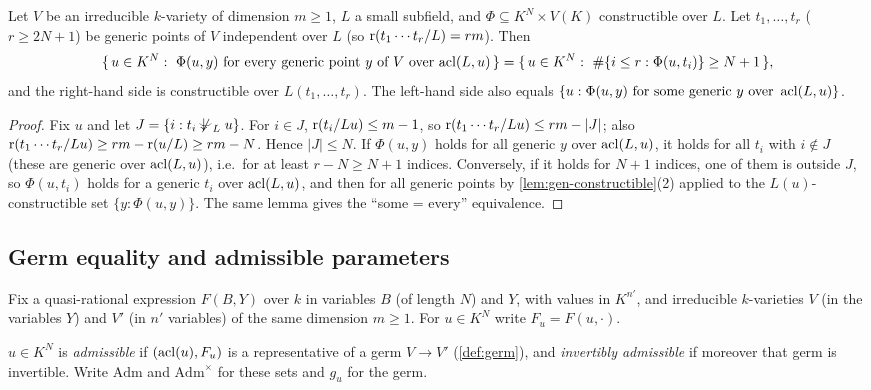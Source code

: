 \begin{lemma}\label{lem:genquant}
Let $V$ be an irreducible $k$-variety of dimension $m\ge1$, $L$ a small subfield, and
$\Phi\subseteq K^N\times V(K)$ constructible over $L$.  Let $t_1,\dots,t_r$ ($r\ge2N+1$) be
generic points of $V$ independent over $L$ (so $\operatorname{r}(t_1\cdots t_r/L)=rm$).  Then
\[
  \{\,u\in K^N:\ \Phi(u,y)\text{ for every generic point $y$ of $V$ over $\operatorname{acl}(L,u)$}\,\}
  =\{\,u\in K^N:\ \#\{i\le r:\Phi(u,t_i)\}\ge N+1\,\},
\]
and the right-hand side is constructible over $L(t_1,\dots,t_r)$.  The left-hand side
also equals $\{u:\Phi(u,y)\text{ for some generic $y$ over }\operatorname{acl}(L,u)\}$.
\end{lemma}
\begin{proof}
Fix $u$ and let $J=\{i: t_i\not\ind{L}u\}$.  For $i\in J$, $\operatorname{r}(t_i/Lu)\le m-1$, so
$\operatorname{r}(t_1\cdots t_r/Lu)\le rm-|J|$; also $\operatorname{r}(t_1\cdots t_r/Lu)\ge rm-\operatorname{r}(u/L)\ge rm-N$.
Hence $|J|\le N$.  If $\Phi(u,y)$ holds for all generic $y$ over $\operatorname{acl}(L,u)$, it holds
for all $t_i$ with $i\notin J$ (these are generic over $\operatorname{acl}(L,u)$), i.e.\ for at least
$r-N\ge N+1$ indices.  Conversely, if it holds for $N+1$ indices, one of them is outside
$J$, so $\Phi(u,t_i)$ holds for a generic $t_i$ over $\operatorname{acl}(L,u)$, and then for all
generic points by \cref{lem:gen-constructible}(2) applied to the $L(u)$-constructible set
$\{y:\Phi(u,y)\}$.  The same lemma gives the ``some = every'' equivalence.
\end{proof}

\subsection{Germ equality and admissible parameters}

Fix a quasi-rational expression $F(B,Y)$ over $k$ in variables $B$ (of length $N$) and
$Y$, with values in $K^{n'}$, and irreducible $k$-varieties $V$ (in the variables $Y$) and
$V'$ (in $n'$ variables) of the same dimension $m\ge1$.  For $u\in K^N$ write
$F_u=F(u,\cdot)$.

\begin{definition}\label{def:admissible}
$u\in K^N$ is \emph{admissible} if $(\operatorname{acl}(u),F_u)$ is a representative of a germ $V\to V'$
(\cref{def:germ}), and \emph{invertibly admissible} if moreover that germ is invertible.
Write $\mathrm{Adm}$ and $\mathrm{Adm}^\times$ for these sets and $g_u$ for the germ.
\end{definition}


